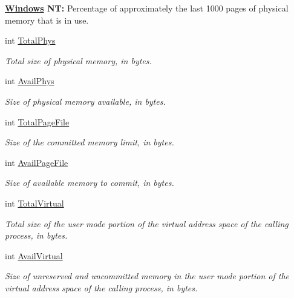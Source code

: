 \begin{DoxyCompactItemize}
\begin{DoxyCompactList}
{\bfseries \hyperlink{namespace_tao_1_1_platform_1_1_windows}{Windows} NT:} Percentage of approximately the last 1000 pages of physical memory that is in use. \item\end{DoxyCompactList}\item 
int \hyperlink{struct_tao_1_1_platform_1_1_windows_1_1_kernel_1_1_m_e_m_o_r_y_s_t_a_t_u_s_ab03b478046b30bab5267b21008d9d330}{TotalPhys}
\begin{DoxyCompactList}\small\item\em Total size of physical memory, in bytes. \item\end{DoxyCompactList}\item 
int \hyperlink{struct_tao_1_1_platform_1_1_windows_1_1_kernel_1_1_m_e_m_o_r_y_s_t_a_t_u_s_af0f8707357ca1cde94b50e8bdb669311}{AvailPhys}
\begin{DoxyCompactList}\small\item\em Size of physical memory available, in bytes. \item\end{DoxyCompactList}\item 
int \hyperlink{struct_tao_1_1_platform_1_1_windows_1_1_kernel_1_1_m_e_m_o_r_y_s_t_a_t_u_s_a15193be7574ab91d6d486631e796478b}{TotalPageFile}
\begin{DoxyCompactList}\small\item\em Size of the committed memory limit, in bytes. \item\end{DoxyCompactList}\item 
int \hyperlink{struct_tao_1_1_platform_1_1_windows_1_1_kernel_1_1_m_e_m_o_r_y_s_t_a_t_u_s_a6e824627bf4c515c1b924f139dee9166}{AvailPageFile}
\begin{DoxyCompactList}\small\item\em Size of available memory to commit, in bytes. \item\end{DoxyCompactList}\item 
int \hyperlink{struct_tao_1_1_platform_1_1_windows_1_1_kernel_1_1_m_e_m_o_r_y_s_t_a_t_u_s_a61f8f15ebc315ebf005bf2ef644d379d}{TotalVirtual}
\begin{DoxyCompactList}\small\item\em Total size of the user mode portion of the virtual address space of the calling process, in bytes. \item\end{DoxyCompactList}\item 
int \hyperlink{struct_tao_1_1_platform_1_1_windows_1_1_kernel_1_1_m_e_m_o_r_y_s_t_a_t_u_s_aeee6de3d7ba6bf3719b13d9d0d3eb47d}{AvailVirtual}
\begin{DoxyCompactList}\small\item\em Size of unreserved and uncommitted memory in the user mode portion of the virtual address space of the calling process, in bytes. \item\end{DoxyCompactList}\end{DoxyCompactItemize}


